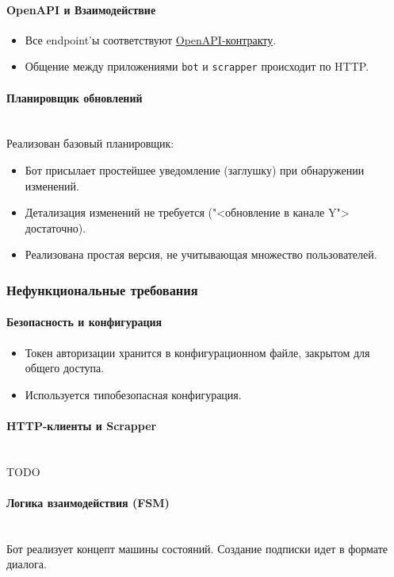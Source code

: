 \paragraph*{OpenAPI и Взаимодействие}
\begin{itemize}
    \item Все endpoint'ы соответствуют \href{TODO}{OpenAPI-контракту}.
    \item Общение между приложениями \texttt{bot} и \texttt{scrapper} происходит по HTTP.
\end{itemize}

\paragraph*{Планировщик обновлений} \mbox{} \\
Реализован базовый планировщик:
\begin{itemize}
    \item Бот присылает простейшее уведомление (заглушку) при обнаружении изменений.
    \item Детализация изменений не требуется ("<обновление в канале Y"> достаточно).
    \item Реализована простая версия, не учитывающая множество пользователей.
\end{itemize}

\subsubsection{Нефункциональные требования}

\paragraph*{Безопасность и конфигурация}
\begin{itemize}
    \item Токен авторизации хранится в конфигурационном файле, закрытом для общего доступа.
    \item Используется типобезопасная конфигурация.
\end{itemize}

\paragraph*{HTTP-клиенты и Scrapper} \mbox{} \\
TODO

\paragraph*{Логика взаимодействия (FSM)} \mbox{} \\
Бот реализует концепт машины состояний. Создание подписки идет в формате диалога.

